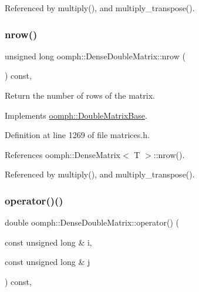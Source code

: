 Referenced by multiply(), and multiply\+\_\+transpose().

\mbox{\label{classoomph_1_1DenseDoubleMatrix_ab67993d1a41ca5ddf05c8210673723f0}} 
\subsubsection{\texorpdfstring{nrow()}{nrow()}}
{\footnotesize\ttfamily unsigned long oomph\+::\+Dense\+Double\+Matrix\+::nrow (\begin{DoxyParamCaption}{ }\end{DoxyParamCaption}) const\hspace{0.3cm}{\ttfamily [inline]}, {\ttfamily [virtual]}}



Return the number of rows of the matrix. 



Implements \hyperlink{classoomph_1_1DoubleMatrixBase_acdcd6e1ea2bf2380f1a2fa32c7829cb5}{oomph\+::\+Double\+Matrix\+Base}.



Definition at line 1269 of file matrices.\+h.



References oomph\+::\+Dense\+Matrix$<$ T $>$\+::nrow().



Referenced by multiply(), and multiply\+\_\+transpose().

\mbox{\label{classoomph_1_1DenseDoubleMatrix_ae41c14d2d7e4b5b568a9b371e7e53fbd}} 
\subsubsection{\texorpdfstring{operator()()}{operator()()}\hspace{0.1cm}{\footnotesize\ttfamily [1/2]}}
{\footnotesize\ttfamily double oomph\+::\+Dense\+Double\+Matrix\+::operator() (\begin{DoxyParamCaption}\item[{const unsigned long \&}]{i,  }\item[{const unsigned long \&}]{j }\end{DoxyParamCaption}) const\hspace{0.3cm}{\ttfamily [inline]}, {\ttfamily [virtual]}}



